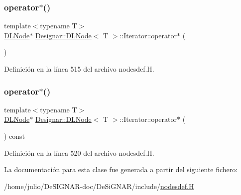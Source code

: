 \subsubsection{\texorpdfstring{operator$\ast$()}{operator*()}\hspace{0.1cm}{\footnotesize\ttfamily [1/2]}}
{\footnotesize\ttfamily template$<$typename T$>$ \\
\hyperlink{class_designar_1_1_d_l_node}{D\+L\+Node}$\ast$ \hyperlink{class_designar_1_1_d_l_node}{Designar\+::\+D\+L\+Node}$<$ T $>$\+::Iterator\+::operator$\ast$ (\begin{DoxyParamCaption}{ }\end{DoxyParamCaption})\hspace{0.3cm}{\ttfamily [inline]}}



Definición en la línea 515 del archivo nodesdef.\+H.

\mbox{\label{class_designar_1_1_d_l_node_1_1_iterator_ae75896ae631f91daaaa9a193df27a239}} 
\subsubsection{\texorpdfstring{operator$\ast$()}{operator*()}\hspace{0.1cm}{\footnotesize\ttfamily [2/2]}}
{\footnotesize\ttfamily template$<$typename T$>$ \\
\hyperlink{class_designar_1_1_d_l_node}{D\+L\+Node}$\ast$ \hyperlink{class_designar_1_1_d_l_node}{Designar\+::\+D\+L\+Node}$<$ T $>$\+::Iterator\+::operator$\ast$ (\begin{DoxyParamCaption}{ }\end{DoxyParamCaption}) const\hspace{0.3cm}{\ttfamily [inline]}}



Definición en la línea 520 del archivo nodesdef.\+H.



La documentación para esta clase fue generada a partir del siguiente fichero\+:\begin{DoxyCompactItemize}
\item 
/home/julio/\+De\+S\+I\+G\+N\+A\+R-\/doc/\+De\+Si\+G\+N\+A\+R/include/\hyperlink{nodesdef_8_h}{nodesdef.\+H}\end{DoxyCompactItemize}
